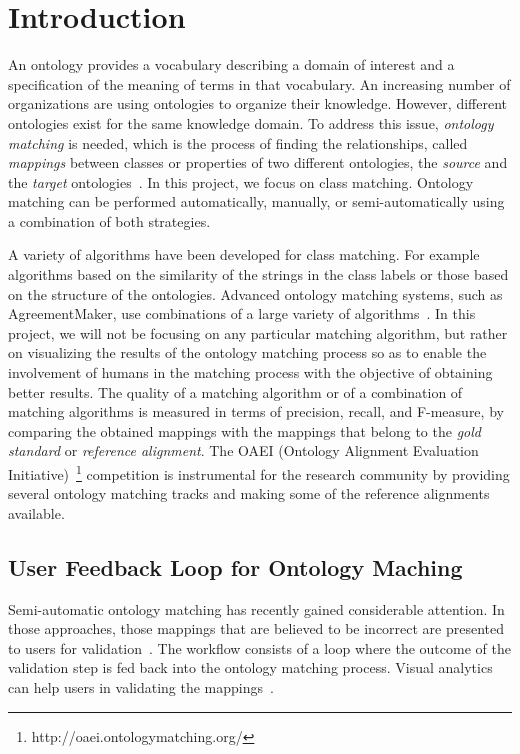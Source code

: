 \chapter{Introduction}
An ontology provides a vocabulary describing a domain of interest and a specification of the meaning of terms in that vocabulary. An increasing number of organizations are using ontologies to %
organize their knowledge. However, different ontologies exist for the same knowledge domain. To address this issue, {\it ontology matching\/} is needed, which is the process of finding the relationships, called {\it mappings\/} between classes or properties of two different ontologies, the {\it source\/} and the {\it target\/} ontologies~\cite{euzenat2007book}. In this project, we focus on class matching. Ontology matching can be performed automatically, manually, or semi-automatically using a  combination of both strategies. 

A variety of algorithms have been developed for class matching. For example algorithms based on the similarity of the strings in the class labels or those based on the structure of the ontologies. Advanced ontology matching systems, such as AgreementMaker, use combinations of a large variety of algorithms~\cite{vldb2009demo,OM-technical}. In this project, we will not be focusing on any particular matching algorithm, but rather on visualizing the results of the ontology matching process so as to enable the involvement of humans in the matching process with the objective of obtaining better results. The quality of a matching algorithm or of a combination of matching algorithms is measured in terms of precision, recall, and F-measure, by comparing the obtained mappings with the mappings that belong to the {\it gold standard\/} or {\it reference alignment}. The OAEI (Ontology Alignment Evaluation Initiative)~\footnote{http://oaei.ontologymatching.org/} competition is instrumental for the research community by providing several ontology matching tracks and making some of the reference alignments available.

\section{User Feedback Loop for Ontology Maching}	%
\label{sub:ufl}

Semi-automatic ontology matching has recently gained considerable attention. In those approaches, those mappings that are believed to be incorrect are presented to users for validation~\cite{cruz-icde-demo,userfeedbackISWC2009}. The workflow consists of a loop where the outcome of the validation step is fed back into the ontology matching process. Visual analytics can help users in validating the mappings~\cite{cruz-icde-demo}.
   
